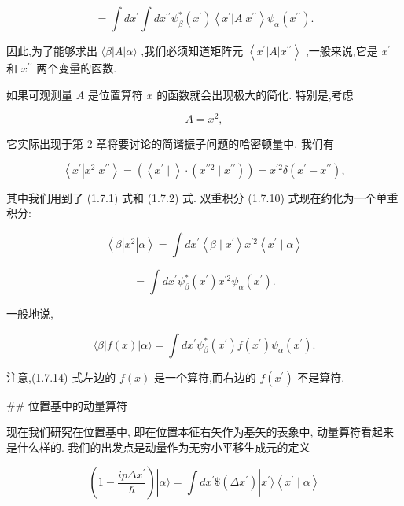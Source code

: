 \documentclass[lang=cn,newtx,10pt,scheme=chinese,thmcnt=section]{elegantbook}
\begin{document}
$$
= \int d{x}^{\prime }\int d{x}^{\prime \prime }{\psi }_{\beta }^{ * }\left( {x}^{\prime }\right) \left\langle {{x}^{\prime }\left| A\right| {x}^{\prime \prime }}\right\rangle {\psi }_{\alpha }\left( {x}^{\prime \prime }\right) .
$$

因此,为了能够求出 $\langle \beta \left| A\right| \alpha \rangle$ ,我们必须知道矩阵元 $\left\langle {{x}^{\prime }\left| A\right| {x}^{\prime \prime }}\right\rangle$ ,一般来说,它是 ${x}^{\prime }$ 和 ${x}^{\prime \prime }$ 两个变量的函数.

如果可观测量 $A$ 是位置算符 $x$ 的函数就会出现极大的简化. 特别是,考虑

$$
A = {x}^{2}, \tag{1. 7.11}
$$

它实际出现于第 2 章将要讨论的简谐振子问题的哈密顿量中. 我们有

$$
\left\langle {{x}^{\prime }\left| {x}^{2}\right| {x}^{\prime \prime }}\right\rangle = \left( {\left\langle {{x}^{\prime } \mid }\right\rangle \cdot \left( {{x}^{\prime \prime 2} \mid {x}^{\prime \prime }}\right) }\right) = {x}^{\prime 2}\delta \left( {{x}^{\prime } - {x}^{\prime \prime }}\right) , \tag{1.7.12}
$$

其中我们用到了 (1.7.1) 式和 (1.7.2) 式. 双重积分 (1.7.10) 式现在约化为一个单重积分:

$$
\left\langle {\beta \left| {x}^{2}\right| \alpha }\right\rangle = \int d{x}^{\prime }\left\langle {\beta \mid {x}^{\prime }}\right\rangle {x}^{\prime 2}\left\langle {{x}^{\prime } \mid \alpha }\right\rangle \tag{1.7.13}
$$

$$
= \int d{x}^{\prime }{\psi }_{\beta }^{ * }\left( {x}^{\prime }\right) {x}^{\prime 2}{\psi }_{\alpha }\left( {x}^{\prime }\right) .
$$

一般地说,

$$
\langle \beta \left| {f\left( x\right) }\right| \alpha \rangle = \int d{x}^{\prime }{\psi }_{\beta }^{ * }\left( {x}^{\prime }\right) f\left( {x}^{\prime }\right) {\psi }_{\alpha }\left( {x}^{\prime }\right) . \tag{1.7.14}
$$

注意,(1.7.14) 式左边的 $f\left( x\right)$ 是一个算符,而右边的 $f\left( {x}^{\prime }\right)$ 不是算符.

## 位置基中的动量算符

现在我们研究在位置基中, 即在位置本征右矢作为基矢的表象中, 动量算符看起来是什么样的. 我们的出发点是动量作为无穷小平移生成元的定义

$$
\left( {1 - \frac{{ip\Delta }{x}^{\prime }}{\hbar }}\right) \left| {\alpha \rangle = \int d{x}^{\prime }\$ \left( {\Delta {x}^{\prime }}\right) }\right| {x}^{\prime }\rangle \left\langle {{x}^{\prime } \mid \alpha }\right\rangle
$$
\end{document}

